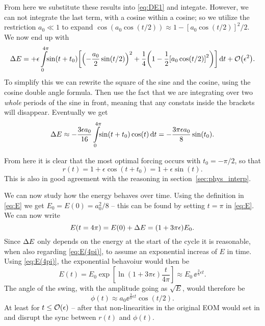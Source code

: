 \documentclass[11pt,letter, swedish, english,%
]{article}
\begin{document}
From here we substitute these results into \eqref{eq:DE1} and
integate. However, we can not integrate the last term, with a cosine
within a cosine; so we utilize the restriction $a_0\ll1$ to expand
$\cos(a_0\cos(t/2))\approx1-[a_0\cos(t/2)]^2/2$. We now end up with
\begin{equation}
\DE=+\epsilon\int_0^{4\pi}\!\!\sin(t+t_0)
\qty[\qty(-\frac{a_0}{2}\sin(t/2))^2
+\frac{1}{4}\qty(1-\frac{1}{2}\qty[a_0\cos(t/2)]^2)
]\id{t}+\order{\epsilon^2}.
\end{equation}
To simplify this we can rewrite the square of the sine and the cosine,
using the cosine double angle formula. Then use the fact that we are
integrating over two \emph{whole} periods of the sine in front,
meaning that any constats inside the brackets will
disappear. Eventually we get
\begin{equation}
\DE\approx
-\frac{3\epsilon a_0}{16}\int_0^{4\pi}\!\!\sin(t+t_0)\cos(t)\id{t}
=-\frac{3\pi\epsilon a_0}{8}\sin(t_0).
\end{equation}

From here it is clear that the most optimal forcing occurs with
$t_0=-\pi/2$, so that
\begin{equation}\label{eq:r}
r(t)=1+\epsilon\cos(t+t_0)=1+\epsilon\sin(t).
\end{equation}
This is also in good agreement with the reasoning in
section~\ref{sec:phys_interp}.

We can now study how the energy behaves over time. Using the
definition in \eqref{eq:E} we get $E_0=E(0)=a_0^2/8$ -- this can be
found by setting $t=\pi$ in \eqref{eq:E}. We can now write
\begin{equation}\label{eq:E(4pi)}
E(t=4\pi)=E(0)+\Delta{E}=(1+3\pi\epsilon)E_0.
\end{equation}
Since $\Delta{E}$ only depends on the energy at the start of the cycle it is
reasonable, when also regarding \eqref{eq:E(4pi)}, to assume an
exponential increas of $E$ in time. Using \eqref{eq:E(4pi)}, the
exponential behavoiur would then be
\begin{equation}
E(t)=E_0\exp[\ln(1+3\pi\epsilon)\frac{t}{4\pi}]
\approx E_0\,\ee^{\frac{3}{4}\epsilon t}.
\end{equation}
The angle of the swing, with the amplitude going as
$\sqrt{E}$, would therefore be 
\begin{equation}\label{eq:phi_from_E}
\phi(t)\approx a_0\ee^{\frac{3}{8}\epsilon t}\cos(t/2).
\end{equation}
At least for $t\le\order{\epsilon}$ -- after that non-linearities in the
original EOM would set in and disrupt the sync between $r(t)$ and
$\phi(t)$. 
\end{document}
